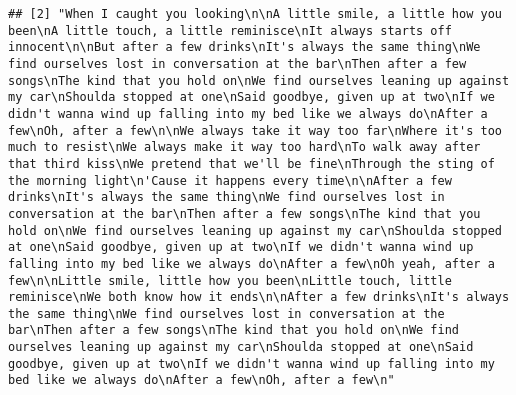 \documentclass[]{article}
\begin{document}
\begin{verbatim}
## [2] "When I caught you looking\n\nA little smile, a little how you been\nA little touch, a little reminisce\nIt always starts off innocent\n\nBut after a few drinks\nIt's always the same thing\nWe find ourselves lost in conversation at the bar\nThen after a few songs\nThe kind that you hold on\nWe find ourselves leaning up against my car\nShoulda stopped at one\nSaid goodbye, given up at two\nIf we didn't wanna wind up falling into my bed like we always do\nAfter a few\nOh, after a few\n\nWe always take it way too far\nWhere it's too much to resist\nWe always make it way too hard\nTo walk away after that third kiss\nWe pretend that we'll be fine\nThrough the sting of the morning light\n'Cause it happens every time\n\nAfter a few drinks\nIt's always the same thing\nWe find ourselves lost in conversation at the bar\nThen after a few songs\nThe kind that you hold on\nWe find ourselves leaning up against my car\nShoulda stopped at one\nSaid goodbye, given up at two\nIf we didn't wanna wind up falling into my bed like we always do\nAfter a few\nOh yeah, after a few\n\nLittle smile, little how you been\nLittle touch, little reminisce\nWe both know how it ends\n\nAfter a few drinks\nIt's always the same thing\nWe find ourselves lost in conversation at the bar\nThen after a few songs\nThe kind that you hold on\nWe find ourselves leaning up against my car\nShoulda stopped at one\nSaid goodbye, given up at two\nIf we didn't wanna wind up falling into my bed like we always do\nAfter a few\nOh, after a few\n"                                                                                                                                                                                 

\end{verbatim}
\end{document}
